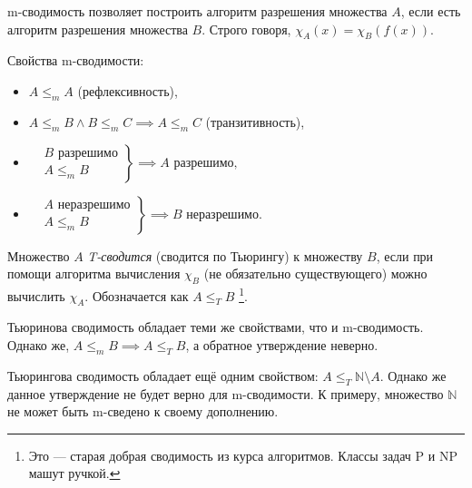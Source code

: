 \documentclass{article}
\begin{document}
    m-сводимость позволяет построить алгоритм разрешения множества $A$, если есть алгоритм
    разрешения множества $B$. Строго говоря, $\chi_A(x) = \chi_B(f(x))$.

    Свойства m-сводимости:
    \begin{itemize}
        \item $A \leqslant_m A$ (рефлексивность),
        \item $A \leqslant_m B \wedge B \leqslant_m C \implies A \leqslant_m C$ (транзитивность),
        \item
        $
        \left.\begin{aligned}
                &B \text{ разрешимо}\\
                &A \leqslant_m B
        \end{aligned}\right\}
        \implies A \text{ разрешимо},
        $
        \item
        $
        \left.\begin{aligned}
                &A \text{ неразрешимо}\\
                &A \leqslant_m B
        \end{aligned}\right\}
        \implies B \text{ неразрешимо}.
        $
    \end{itemize}

    \begin{definition}
        Множество $A$ \textit{T-сводится} (сводится по Тьюрингу) к множеству $B$, если при помощи
        алгоритма вычисления $\chi_B$ (не обязательно существующего) можно вычислить $\chi_A$.
        Обозначается как $A \leqslant_T B$ \footnote{Это --- старая добрая сводимость из курса
        алгоритмов. Классы задач P и NP машут ручкой.}.
    \end{definition}

    Тьюринова сводимость обладает теми же свойствами, что и m-сводимость. Однако же, $A \leqslant_m
    B \implies A \leqslant_T B$, а обратное утверждение неверно.

    Тьюрингова сводимость обладает ещё одним свойством: $A \leqslant_T \mathbb{N} \setminus A$.
    Однако же данное утверждение не будет верно для m-сводимости. К примеру, множество $\mathbb{N}$
    не может быть m-сведено к своему дополнению.
\end{document}
